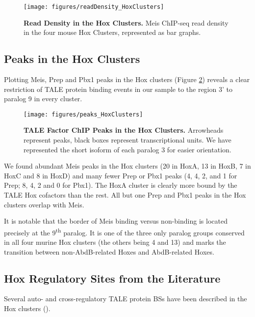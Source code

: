 \begin{figure}[]
  \centering
  \texttt{[image: figures/readDensity\_HoxClusters]}
  \caption[Read Density in the Hox Clusters]{\textbf{Read Density in the Hox Clusters.} Meis ChIP-seq read density in the four mouse Hox Clusters, represented as bar graphs.}
  \label{fig:readDensity}
\end{figure}

\subsection{Peaks in the Hox Clusters}

Plotting Meis, Prep and Pbx1 peaks in the Hox clusters (Figure \ref{fig:peaksClusters}) reveals a clear restriction of \ac{TALE} protein binding events in our sample to the region 3' to paralog 9 in every cluster. 

\begin{figure}[]
  \centering
  \texttt{[image: figures/peaks\_HoxClusters]}
  \caption[TALE Factor ChIP Peaks in the Hox Clusters]{\textbf{TALE Factor ChIP Peaks in the Hox Clusters.} Arrowheads represent peaks, black boxes represent transcriptional units. We have represented the short isoform of each paralog 3 for easier orientation.}
  \label{fig:peaksClusters}
\end{figure}

We found abundant Meis peaks in the Hox clusters (20 in HoxA, 13 in HoxB, 7 in HoxC and 8 in HoxD) and many fewer Prep or Pbx1 peaks (4, 4, 2, and 1 for Prep; 8, 4, 2 and 0 for Pbx1). The HoxA cluster is clearly more bound by the \ac{TALE} Hox cofactors than the rest. All but one Prep and Pbx1 peaks in the Hox clusters overlap with Meis. 

It is notable that the border of Meis binding versus non-binding is located precisely at the 9\textsuperscript{th} paralog. It is one of the three only paralog groups conserved in all four murine Hox clusters (the others being 4 and 13) and marks the transition between non-AbdB-related Hoxes and AbdB-related Hoxes. 

\subsection{Hox Regulatory Sites from the Literature}

Several auto- and cross-regulatory \ac{TALE} protein \acp{BS} have been described in the Hox clusters (\cite{Lampe2008, Gould1997, Jacobs1999, Manzanares2001, Poepperl1995, Tuempel2007}). 

